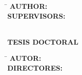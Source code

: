 \begin{titlepage}
{      \noindent
      \begin{minipage}[t]{0.40\textwidth}
        \raggedright
        {\itshape\fontsize{14}{20}\selectfont \thetitle\par}
      \end{minipage}%
      \begin{minipage}[t]{0.4\textwidth}
        \raggedright
        \begin{tabbing}
          \hspace{4cm}\=\kill
          \textbf{\fontsize{12}{10}\selectfont AUTHOR:}\> \GetFirstAuthor \\[0.3cm]
          \textbf{\fontsize{12}{10}\selectfont SUPERVISORS:}\> \GetSupervisor   \\
                                              \> \GetCoSupervisor    \\
                                              \> \GetSecCoSupervisor
        \end{tabbing}
      \end{minipage}%
      \begin{minipage}[t]{0.1\textwidth}
        \vspace{1.5cm}
        \raggedleft
        {\fontsize{13}{16}\selectfont \the\year \par}
      \end{minipage}
    }{%
      {\noindent\bfseries\fontsize{12}{14}\selectfont TESIS DOCTORAL\par}
      \vspace{0.5cm}
      {\noindent\raggedright\itshape\fontsize{22}{24}\selectfont \titleesp\par}
      \vspace{2cm}

      \noindent
      
      \begin{minipage}[t]{0.4\textwidth}
        \raggedright
        \begin{tabbing}
          \hspace{4cm}\=\kill
          \textbf{\fontsize{12}{10}\selectfont AUTOR:}\> \GetFirstAuthor \\[0.3cm]
          \textbf{\fontsize{12}{10}\selectfont DIRECTORES:}\> \GetSupervisor   \\
                                              \> \GetCoSupervisor    \\
                                              \> \GetSecCoSupervisor
        \end{tabbing}
      \end{minipage}%
      \begin{minipage}[t]{0.45\textwidth}
        \vspace{2cm}
        \raggedleft
        {\fontsize{13}{16}\selectfont \the\year \par}
      \end{minipage}
    }

    \vspace{1cm}
  \endgroup
\end{titlepage}
\restoregeometry
\MediaOptionLogicBlank
